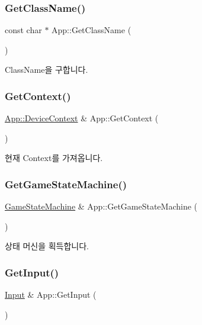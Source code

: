 \subsubsection{\texorpdfstring{GetClassName()}{GetClassName()}}
{\footnotesize\ttfamily const char $\ast$ App\+::\+Get\+Class\+Name (\begin{DoxyParamCaption}{ }\end{DoxyParamCaption})}

Class\+Name을 구합니다. \mbox{\label{class_app_a9ea6b9c0b558a55ac215083ad76e515b}} 
\subsubsection{\texorpdfstring{GetContext()}{GetContext()}}
{\footnotesize\ttfamily \mbox{\hyperlink{struct_app_1_1_device_context}{App\+::\+Device\+Context}} \& App\+::\+Get\+Context (\begin{DoxyParamCaption}{ }\end{DoxyParamCaption})}

현재 Context를 가져옵니다. \mbox{\label{class_app_a282a5089103c9da94adcac6092047dac}} 
\subsubsection{\texorpdfstring{GetGameStateMachine()}{GetGameStateMachine()}}
{\footnotesize\ttfamily \mbox{\hyperlink{class_game_state_machine}{Game\+State\+Machine}} \& App\+::\+Get\+Game\+State\+Machine (\begin{DoxyParamCaption}{ }\end{DoxyParamCaption})}

상태 머신을 획득합니다. \mbox{\label{class_app_a53841688199515d638baac375243e13f}} 
\subsubsection{\texorpdfstring{GetInput()}{GetInput()}}
{\footnotesize\ttfamily \mbox{\hyperlink{class_input}{Input}} \& App\+::\+Get\+Input (\begin{DoxyParamCaption}{ }\end{DoxyParamCaption})}

